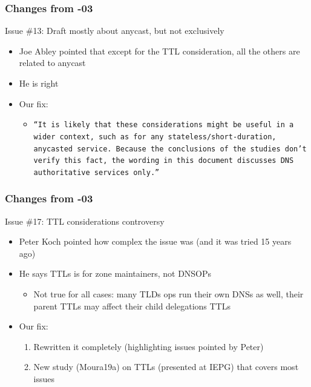 \documentclass[11pt,show 
notes,notheorems,noamsthm,blank]{beamer} %
\begin{document}
\begin{frame}
\frametitle{Changes from -03}
\begin{block}{ Issue \#13: Draft mostly about anycast, but not exclusively}
\begin{itemize}
 \item Joe Abley pointed that except for the TTL consideration, all the others are related to anycast
 \item He is right
 \item Our fix:
 \begin{itemize}
 
 \item
 
      \texttt{``It is likely that these considerations might be useful in a wider context,
         such as for any stateless/short-duration, anycasted service. 
         Because the conclusions of the studies don't verify this fact, 
         the wording in this document discusses DNS authoritative services only.''}

 \end{itemize}
\end{itemize} 

 
\end{block}



\end{frame}



\begin{frame}
\frametitle{Changes from -03}
\begin{block}{ Issue \#17: TTL considerations controversy }
\begin{itemize}
\item Peter Koch pointed how complex the issue was (and it was tried 15 years ago)
\item He says TTLs is for zone maintainers, not DNSOPs 
\begin{itemize}
 \item Not true for all cases: many TLDs ops run their own DNSs as well, their parent TTLs may affect their child delegations TTLs
 
\end{itemize}
\item Our fix:
\begin{enumerate}
 \item Rewritten  it completely (highlighting issues pointed by Peter)
 \item New study (Moura19a) on TTLs (presented at IEPG) that covers most issues
\end{enumerate}

\end{itemize} 

 
\end{block}
\end{frame}
\end{document}
